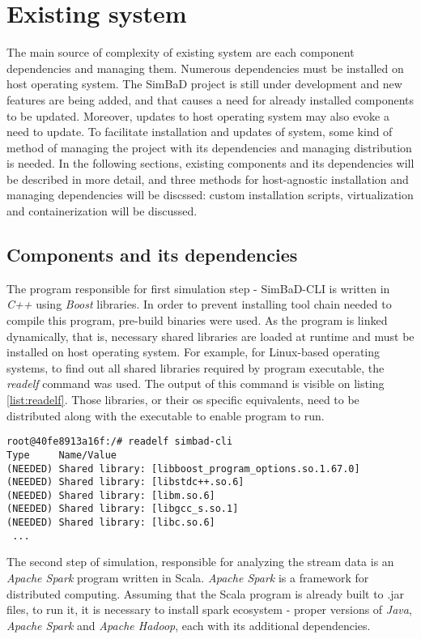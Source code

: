 \chapter{Existing system}
The main source of complexity of existing system are each component dependencies and managing them. Numerous dependencies must be installed on host operating system. The SimBaD project is still under development and new features are being added, and that causes a need for already installed components to be updated. Moreover, updates to host operating system may also evoke a need to update. To facilitate installation and updates of system, some kind of method of managing the project with its dependencies and managing distribution is needed. In the following sections, existing components and its dependencies will be described in more detail, and three methods for host-agnostic installation and managing dependencies will be discssed: custom installation scripts, virtualization and containerization  will be discussed.
\section{Components and its dependencies}
 The program responsible for first simulation step - SimBaD-CLI is written in \textit{C++} using \textit{Boost} libraries. In order to prevent installing tool chain needed to compile this program, pre-build binaries were used.  As the program is linked dynamically, that is, necessary shared libraries are loaded at runtime and must be installed on host operating system. For example, for Linux-based operating systems, to find out all shared libraries required by program executable, the \textit{readelf} command was used. The output of this command is visible on listing \ref{list:readelf}. Those libraries, or their os specific equivalents, need to be distributed along with the executable to enable program to run. 
\begin{lstlisting}[label=list:readelf,caption=The output of readelf command (Tag column ommited), basicstyle=\footnotesize\ttfamily]
root@40fe8913a16f:/# readelf simbad-cli 
Type     Name/Value
(NEEDED) Shared library: [libboost_program_options.so.1.67.0]
(NEEDED) Shared library: [libstdc++.so.6]
(NEEDED) Shared library: [libm.so.6]
(NEEDED) Shared library: [libgcc_s.so.1]
(NEEDED) Shared library: [libc.so.6]
 ...
\end{lstlisting}

The second step of simulation, responsible for analyzing the stream data is an \textit{Apache Spark} program written in Scala. \textit{Apache Spark} is a framework for distributed computing. Assuming that the Scala program is already built to .jar files, to run it, it is necessary to install spark ecosystem - proper versions of \textit{Java}, \textit{Apache Spark} and \textit{Apache Hadoop}, each with its additional dependencies.

